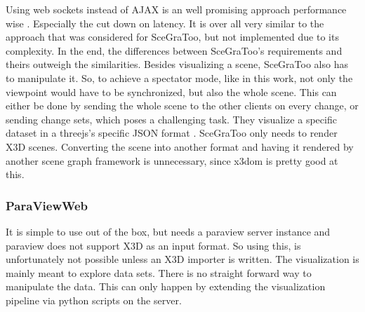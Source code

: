 Using web sockets instead of AJAX is an well promising approach performance wise
\cite{Marion:2012:RCS:2338714.2338721}. Especially the cut down on latency. It is
over all very similar to the approach that was considered for SceGraToo, but not
implemented due to its complexity. In the end, the differences between
SceGraToo's requirements and theirs outweigh the similarities. Besides visualizing a scene,
\gls{SceGraToo} also has to manipulate it. So, to achieve a spectator mode,
like in this work, not only the viewpoint would have to be synchronized, but also
the whole scene. This can either be done by sending the whole scene to the other
clients on every change, or sending change sets, which poses a challenging task.
They visualize a specific dataset in a threejs's specific \gls{JSON} format
\cite{threejs-format}. \gls{SceGraToo} only needs to render \gls{X3D} scenes. Converting the
scene into another format and having it rendered by another scene graph framework
is unnecessary, since x3dom is pretty good at this.

\subsubsection{ParaViewWeb}
\label{paraviewweb-pvweb}

It is simple to use out of the box, but needs a paraview server instance and
paraview does not support \gls{X3D} as an input format. So using this, is unfortunately
not possible unless an X3D importer is written. The visualization is
mainly meant to explore data sets. There is no straight forward way to manipulate
the data. This can only happen by extending the visualization
pipeline via python scripts on the server. \cite{paraviewweb}
